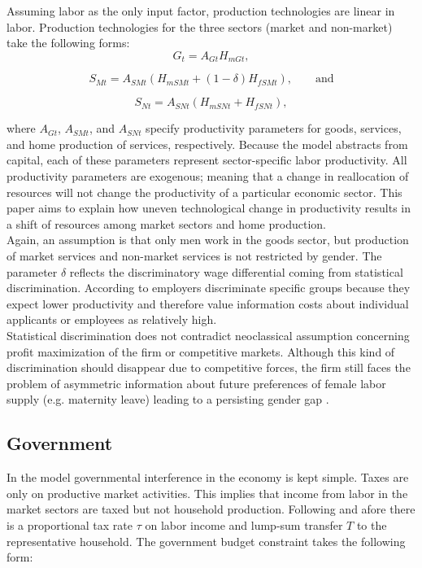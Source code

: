 \documentclass[a4paper,12pt]{article}
\begin{document}
Assuming labor as the only input factor, production technologies are linear in labor. Production technologies for the three sectors (market and non-market) take the following forms:
\begin{equation}
\label{AG}
G_t =  A_{Gt} H_{mGt},
\end{equation}

\begin{equation}
\label{ASM}
S_{Mt} =  A_{SMt}(H_{mSMt}+ (1- \delta)H_{fSMt}), \qquad \text{and}
\end{equation}

\begin{equation}\label{ASN}
S_{Nt} =  A_{SNt}(H_{mSNt}+ H_{fSNt}),
\end{equation}

where $A_{Gt}$, $A_{SMt}$, and $A_{SNt}$ specify productivity parameters for goods, services, and home production of services, respectively. Because the model abstracts from capital, each of these parameters represent sector-specific labor productivity. All productivity parameters are exogenous; meaning that a change in reallocation of resources will not change the productivity of a particular economic sector. This paper aims to explain how uneven technological change in productivity results in a shift of resources among market sectors and home production.\\
Again, an assumption is that only men work in the goods sector, but production of market services and non-market services is not restricted by gender. 
The parameter $\delta$ reflects the discriminatory wage differential coming from statistical discrimination. According to \citet{Phelps:1972} employers discriminate specific groups because they expect lower productivity and therefore value information costs about individual applicants or employees as relatively high.\\
Statistical discrimination does not contradict neoclassical assumption concerning profit maximization of the firm or competitive markets. Although this kind of discrimination should disappear due to competitive forces, the firm still faces the problem of asymmetric information about future preferences of female labor supply (e.g. maternity leave) leading to  a persisting gender gap \citep{BlauKahn:2016}.

\subsection{Government}

In the model governmental interference in the economy is kept simple. Taxes are only on productive market activities. This implies that income from labor in the market sectors are taxed but not household production. Following \citep{Rogerson:2008} and afore \citep {Prescott:2004} there is a proportional tax rate $\tau$ on labor income and lump-sum transfer $T$ to the representative household. The government budget constraint takes the following form:
\end{document}
